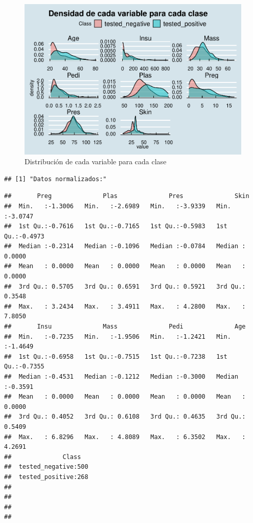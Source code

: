 \documentclass[
]{article}
\begin{document}
\begin{figure}

{\centering \includegraphics[width=0.75\linewidth]{pima-clasificacion_files/figure-latex/multi_density-1} 

}

\caption{Distribución de cada variable para cada clase}\label{fig:multi_density}
\end{figure}

\begin{verbatim}
## [1] "Datos normalizados:"
\end{verbatim}

\begin{verbatim}
##       Preg              Plas              Pres              Skin        
##  Min.   :-1.3006   Min.   :-2.6989   Min.   :-3.9339   Min.   :-3.0747  
##  1st Qu.:-0.7616   1st Qu.:-0.7165   1st Qu.:-0.5983   1st Qu.:-0.4973  
##  Median :-0.2314   Median :-0.1096   Median :-0.0784   Median : 0.0000  
##  Mean   : 0.0000   Mean   : 0.0000   Mean   : 0.0000   Mean   : 0.0000  
##  3rd Qu.: 0.5705   3rd Qu.: 0.6591   3rd Qu.: 0.5921   3rd Qu.: 0.3548  
##  Max.   : 3.2434   Max.   : 3.4911   Max.   : 4.2800   Max.   : 7.8050  
##       Insu              Mass              Pedi              Age         
##  Min.   :-0.7235   Min.   :-1.9506   Min.   :-1.2421   Min.   :-1.4649  
##  1st Qu.:-0.6958   1st Qu.:-0.7515   1st Qu.:-0.7238   1st Qu.:-0.7355  
##  Median :-0.4531   Median :-0.1212   Median :-0.3000   Median :-0.3591  
##  Mean   : 0.0000   Mean   : 0.0000   Mean   : 0.0000   Mean   : 0.0000  
##  3rd Qu.: 0.4052   3rd Qu.: 0.6108   3rd Qu.: 0.4635   3rd Qu.: 0.5409  
##  Max.   : 6.8296   Max.   : 4.8089   Max.   : 6.3502   Max.   : 4.2691  
##              Class    
##  tested_negative:500  
##  tested_positive:268  
##                       
##                       
##                       
## 
\end{verbatim}
\end{document}
